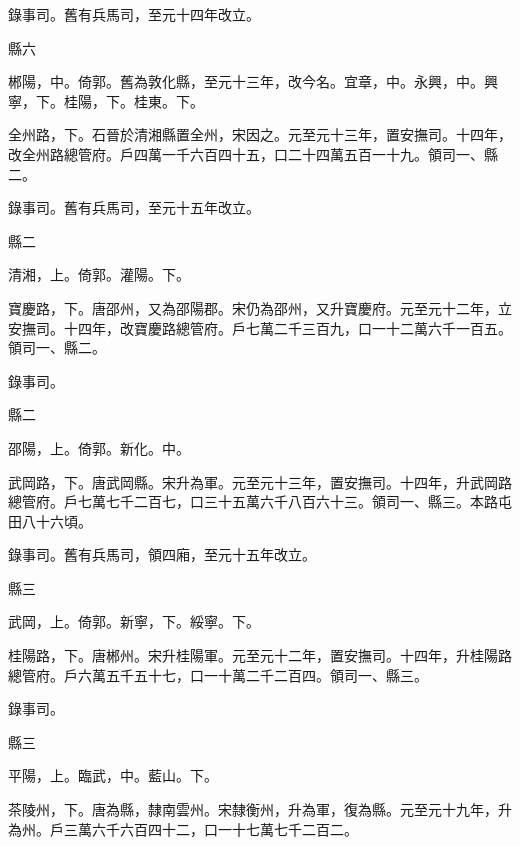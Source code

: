 \begin{pinyinscope}
 錄事司。舊有兵馬司，至元十四年改立。



 縣六



 郴陽，中。倚郭。舊為敦化縣，至元十三年，改今名。宜章，中。永興，中。興寧，下。桂陽，下。桂東。下。



 全州路，下。石晉於清湘縣置全州，宋因之。元至元十三年，置安撫司。十四年，改全州路總管府。戶四萬一千六百四十五，口二十四萬五百一十九。領司一、縣二。



 錄事司。舊有兵馬司，至元十五年改立。



 縣二



 清湘，上。倚郭。灌陽。下。



 寶慶路，下。唐邵州，又為邵陽郡。宋仍為邵州，又升寶慶府。元至元十二年，立安撫司。十四年，改寶慶路總管府。戶七萬二千三百九，口一十二萬六千一百五。領司一、縣二。



 錄事司。



 縣二



 邵陽，上。倚郭。新化。中。



 武岡路，下。唐武岡縣。宋升為軍。元至元十三年，置安撫司。十四年，升武岡路總管府。戶七萬七千二百七，口三十五萬六千八百六十三。領司一、縣三。本路屯田八十六頃。



 錄事司。舊有兵馬司，領四廂，至元十五年改立。



 縣三



 武岡，上。倚郭。新寧，下。綏寧。下。



 桂陽路，下。唐郴州。宋升桂陽軍。元至元十二年，置安撫司。十四年，升桂陽路總管府。戶六萬五千五十七，口一十萬二千二百四。領司一、縣三。



 錄事司。



 縣三



 平陽，上。臨武，中。藍山。下。



 茶陵州，下。唐為縣，隸南雲州。宋隸衡州，升為軍，復為縣。元至元十九年，升為州。戶三萬六千六百四十二，口一十七萬七千二百二。




\end{pinyinscope}
